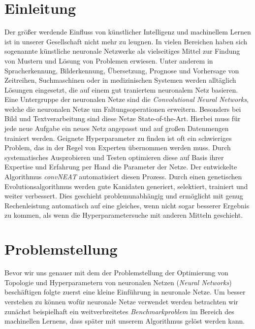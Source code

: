 \documentclass[]{scrartcl}
\begin{document}
	
	\thispagestyle{empty}
	\pagestyle{empty}
	\newpage
	\tableofcontents
	\newpage
	\pagestyle{plain}
	

\section{Einleitung}

	Der größer werdende Einfluss von künstlicher Intelligenz und machinellem Lernen ist in unserer Gesellschaft nicht mehr zu leugnen.
	In vielen Bereichen haben sich sogenannte künstliche neuronale Netzwerke als vielseitiges Mittel zur Findung von Mustern und Lösung von Problemen erwiesen.
	Unter anderem in Spracherkennung, Bilderkennung, Übersetzung, Prognose und Vorhersage von Zeitreihen, Suchmaschinen oder in medizinischen Systemen werden
	alltäglich Lösungen eingesetzt, die auf einem gut traniertem neuronalem Netz basieren.
	Eine Untergruppe der neuronalen Netze sind die \textit{Convolutional Neural Networks}, welche die neuronalen Netze um Faltungsoperationen erweitern.
	Besonders bei Bild und Textverarbeitung sind diese Netze State-of-the-Art.
	Hierbei muss für jede neue Aufgabe ein neues Netz angepasst und auf großen Datenmengen trainiert werden.
	Geignete Hyperparameter zu finden ist oft ein schwieriges Problem, das in der Regel von Experten übernommen werden muss.
	Durch systematisches Ausprobieren und Testen optimieren diese auf Basis ihrer Expertise und Erfahrung per Hand die Parameter der Netze.
	Der entwickelte Algorithmus \textit{convNEAT} automatisiert diesen Prozess.
	Durch einen genetischen Evolutionsalgorithmus werden gute Kanidaten generiert, selektiert, trainiert und weiter verbessert.
	Dies geschieht problemunabhängig und ermöglicht mit genug Rechenleistung automatisch auf eine gleiches, wenn nicht sogar besserer Ergebnis zu kommen, als wenn die Hyperparametersuche mit anderen Mitteln geschieht.

\clearpage

	
\section{Problemstellung}

	Bevor wir uns genauer mit dem der Problemstellung der Optimierung von Topologie und Hyperparametern von neuronalen Netzen (\textit{Neural Networks}) beschäftigen folgte zuerst eine kleine Einführung in neuronale Netze.
	Um besser verstehen zu können wofür neuronale Netze verwendet werden betrachten wir zunächst beispielhaft ein weitverbreitetes \textit{Benchmarkproblem} im Bereich des machinellen Lernens,
	dass später mit unserem Algorithmus gelöst werden kann.
\end{document}
